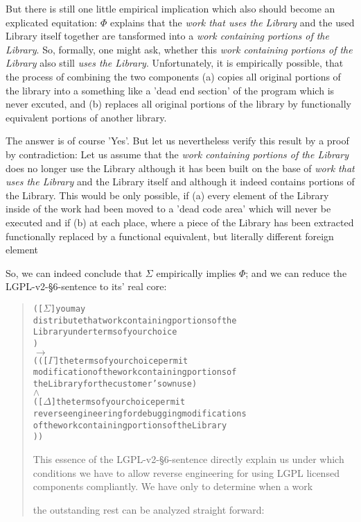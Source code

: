 \begin{description}
But there is still one little empirical implication which also should become an
explicated equitation: $\Phi$ explains that the \emph{work that uses the
Library} and the used Library itself together are tansformed into a \emph{work
containing portions of the Library}. So, formally, one might ask, whether this
\emph{work containing portions of the Library} also still \emph{uses the
Library}. Unfortunately, it is empirically possible, that the process of
combining the two components (a) copies all original portions of the library
into a something like a 'dead end section' of the program which is never
excuted, and (b) replaces all original portions of the library by functionally
equivalent portions of another library.


The answer is of course 'Yes'. But let us nevertheless verify this
result by a proof by contradiction: Let us assume that the \emph{work containing
portions of the Library} does no longer use the Library although it has been
built on the base of \emph{work that uses the Library} and the Library itself
and although it indeed contains portions of the Library. This would be only
possible, if (a) every element of the Library inside of the work had been moved
to a 'dead code area' which will never be executed and if (b) at each place,
where a piece of the Library has been extracted functionally replaced by a
functional equivalent, but literally different foreign element

So, we can indeed
conclude that $\Sigma$ empirically implies $\Phi$; and we can reduce the
LGPL-v2-§6-sentence to its' real core:

\begin{quote}
\begin{alltt}   
(   [\(\Sigma\)] you may 
        distribute that work containing portions of the 
        Library under terms of your choice 
) 
\(\rightarrow\)
( ( [\(\Gamma\)] the terms of your choice permit 
        modification of the work containing portions of 
        the Library for the customer's own use )
  \(\wedge\)
  ( [\(\Delta\)] the terms of your choice permit
        reverse engineering for debugging modifications 
        of the work containing portions of the Library   
) )
\end{alltt}

This essence of the LGPL-v2-§6-sentence directly explain us under which
conditions we have to allow reverse engineering for using LGPL licensed
components compliantly. We have only to determine when a work 

 the outstanding rest can be analyzed straight
forward:

\end{quote}


\end{description}




